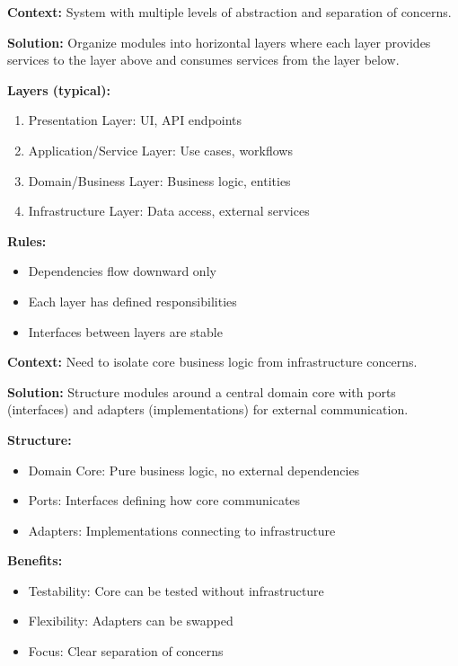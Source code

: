 \documentclass[11pt,letterpaper]{article}
\begin{document}
\begin{patternbox}
\textbf{Context:} System with multiple levels of abstraction and separation of concerns.

\textbf{Solution:} Organize modules into horizontal layers where each layer provides services to the layer above and consumes services from the layer below.

\textbf{Layers (typical):}
\begin{enumerate}[nosep]
    \item Presentation Layer: UI, API endpoints
    \item Application/Service Layer: Use cases, workflows
    \item Domain/Business Layer: Business logic, entities
    \item Infrastructure Layer: Data access, external services
\end{enumerate}

\textbf{Rules:}
\begin{itemize}[nosep]
    \item Dependencies flow downward only
    \item Each layer has defined responsibilities
    \item Interfaces between layers are stable
\end{itemize}
\end{patternbox}

\begin{patternbox}
\textbf{Context:} Need to isolate core business logic from infrastructure concerns.

\textbf{Solution:} Structure modules around a central domain core with ports (interfaces) and adapters (implementations) for external communication.

\textbf{Structure:}
\begin{itemize}[nosep]
    \item Domain Core: Pure business logic, no external dependencies
    \item Ports: Interfaces defining how core communicates
    \item Adapters: Implementations connecting to infrastructure
\end{itemize}

\textbf{Benefits:}
\begin{itemize}[nosep]
    \item Testability: Core can be tested without infrastructure
    \item Flexibility: Adapters can be swapped
    \item Focus: Clear separation of concerns
\end{itemize}
\end{patternbox}
\end{document}
